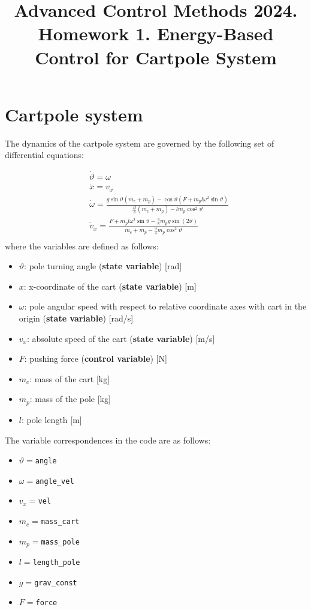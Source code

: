 \documentclass[12pt]{article}
\title{Advanced Control Methods 2024. Homework 1. Energy-Based Control for Cartpole System}
\begin{document}
\section*{Cartpole system}

The dynamics of the cartpole system are governed by the following set of differential equations:

\begin{equation}
    \label{eqn_state_dynamics}
    \begin{aligned}
        &\dot{\vartheta} =  \omega \\
        &\dot{x} = v_x \\
        &\dot{\omega} =  \frac{g \sin{\vartheta}(m_c + m_p) - \cos{\vartheta}(F + m_p l \omega^2 \sin{\vartheta})}{\frac{4l}{3}(m_c + m_p) - lm_p \cos^2{\vartheta}}\\
        &\dot{v}_x = \frac{F + m_p l \omega ^2 \sin{\vartheta} - \frac{3}{8}m_p g\sin(2\vartheta)}{m_c + m_p - \frac{3}{4} m_p \cos ^ 2 \vartheta} \\
    \end{aligned}
\end{equation}
where the variables are defined as follows:
\begin{itemize}
\item $\vartheta$: pole turning angle (\textbf{state variable}) [rad]
\item $x$: x-coordinate of the cart (\textbf{state variable}) [m]
\item $\omega$: pole angular speed with respect to relative coordinate axes with cart in the origin (\textbf{state variable}) [rad/s]
\item $v_x$: absolute speed of the cart (\textbf{state variable}) [m/s]
\item $F$: pushing force (\textbf{control variable}) [N]
\item $m_c$: mass of the cart [kg]
\item $m_p$: mass of the pole [kg]
\item $l$: pole length [m]
\end{itemize}
The variable correspondences in the code are as follows:
\begin{itemize}
    \item $\vartheta=$\texttt{angle}
    \item $\omega=$\texttt{angle\_vel}
    \item $v_x=$\texttt{vel}
    \item $m_c=$\texttt{mass\_cart}
    \item $m_p=$\texttt{mass\_pole}
    \item $l=$\texttt{length\_pole}
    \item $g=$\texttt{grav\_const}
    \item $F=$\texttt{force}
\end{itemize}
\end{document}
